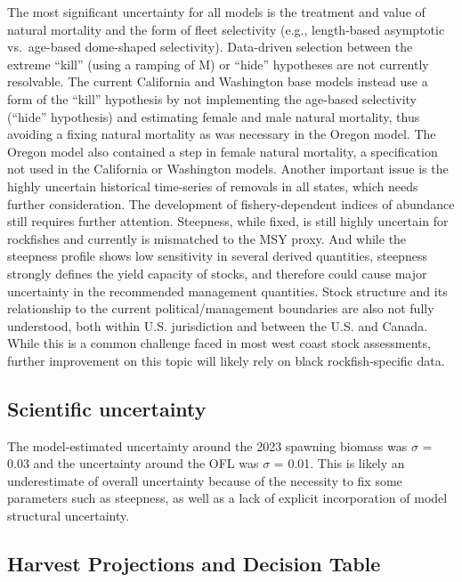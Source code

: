 \documentclass[11pt,
  english,
  letterpaper,
]{article}
\begin{document}
The most significant uncertainty for all models is the treatment and value of natural mortality and the form of fleet selectivity (e.g., length-based asymptotic vs.~age-based dome-shaped selectivity). Data-driven selection between the extreme ``kill'' (using a ramping of M) or ``hide'' hypotheses are not currently resolvable. The current California and Washington base models instead use a form of the ``kill'' hypothesis by not implementing the age-based selectivity (``hide'' hypothesis) and estimating female and male natural mortality, thus avoiding a fixing natural mortality as was necessary in the Oregon model. The Oregon model also contained a step in female natural mortality, a specification not used in the California or Washington models. Another important issue is the highly uncertain historical time-series of removals in all states, which needs further consideration. The development of fishery-dependent indices of abundance still requires further attention. Steepness, while fixed, is still highly uncertain for rockfishes and currently is mismatched to the MSY proxy. And while the steepness profile shows low sensitivity in several derived quantities, steepness strongly defines the yield capacity of stocks, and therefore could cause major uncertainty in the recommended management quantities. Stock structure and its relationship to the current political/management boundaries are also not fully understood, both within U.S. jurisdiction and between the U.S. and Canada. While this is a common challenge faced in most west coast stock assessments, further improvement on this topic will likely rely on black rockfish-specific data.

\hypertarget{scientific-uncertainty}{%
\subsection*{Scientific uncertainty}\label{scientific-uncertainty}}

The model-estimated uncertainty around the 2023 spawning biomass was \(\sigma\) = 0.03 and the uncertainty around the OFL was \(\sigma\) = 0.01. This is likely an underestimate of overall uncertainty because of the necessity to fix some parameters such as steepness, as well as a lack of explicit incorporation of model structural uncertainty.

\hypertarget{harvest-projections-and-decision-table}{%
\subsection*{Harvest Projections and Decision Table}\label{harvest-projections-and-decision-table}}
\end{document}
